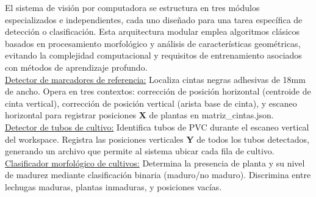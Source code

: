 El sistema de visión por computadora se estructura en tres módulos especializados e independientes, cada uno diseñado para una tarea específica de detección o clasificación. Esta arquitectura modular emplea algoritmos clásicos basados en procesamiento morfológico y análisis de características geométricas, evitando la complejidad computacional y requisitos de entrenamiento asociados con métodos de aprendizaje profundo.\\

\underline{Detector de marcadores de referencia:} Localiza cintas negras adhesivas de 18mm de ancho. Opera en tres contextos: corrección de posición horizontal (centroide de cinta vertical), corrección de posición vertical (arista base de cinta), y escaneo horizontal para registrar posiciones \textbf{X} de plantas en matriz\_cintas.json.\\

\underline{Detector de tubos de cultivo:} Identifica tubos de PVC durante el escaneo vertical del workspace. Registra las posiciones verticales \textbf{Y} de todos los tubos detectados, generando un archivo que permite al sistema ubicar cada fila de cultivo.\\

\underline{Clasificador morfológico de cultivos:} Determina la presencia de planta y su nivel de madurez mediante clasificación binaria (maduro/no maduro). Discrimina entre lechugas maduras, plantas inmaduras, y posiciones vacías.


